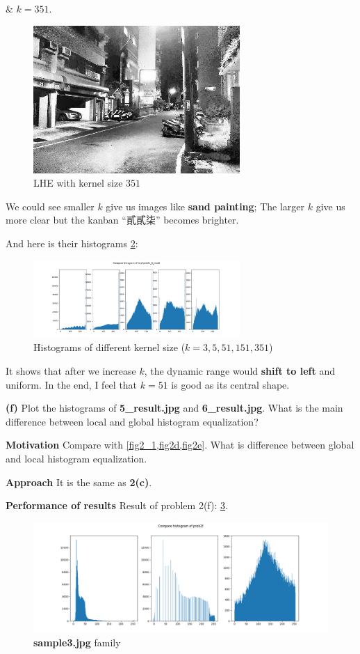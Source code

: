 \& $k=351$.
\begin{figure}
  \centering
  \includegraphics[width=0.7\textwidth]{image/tmp/6_result_4.jpg}
  \caption{LHE with kernel size $351$}
  \label{fig2e_4}
\end{figure}
We could see smaller $k$ give us images like \textbf{sand painting}; The larger $k$ give us more clear but the kanban ``貳貳柒'' becomes brighter.

And here is their histograms \cref{fig2e_hist}:
\begin{figure}
  \centering
  \includegraphics[width=0.7\textwidth]{image/tmp/prob2c_6_result.png}
  \caption{Histograms of different kernel size ($k=3,5,51,151,351$)}
  \label{fig2e_hist}
\end{figure}
It shows that after we increase $k$, the dynamic range would \textbf{shift to left} and uniform.
In the end, I feel that $k=51$ is good as its central shape.

\textbf{(f)} Plot the histograms of \textbf{5\_result.jpg} and \textbf{6\_result.jpg}. What is the main difference between local and global histogram equalization?

\textbf{Motivation}
Compare with \cref{fig2_1,fig2d,fig2e}. What is difference between global and local histogram equalization.

\textbf{Approach}
It is the same as \textbf{2(c)}.

\textbf{Performance of results}
Result of problem 2(f): \cref{fig2f}.
\begin{figure}
  \centering
  \includegraphics[width=\textwidth]{image/prob2f.png}
  \caption{\textbf{sample3.jpg} family}
  \label{fig2f}
\end{figure}

